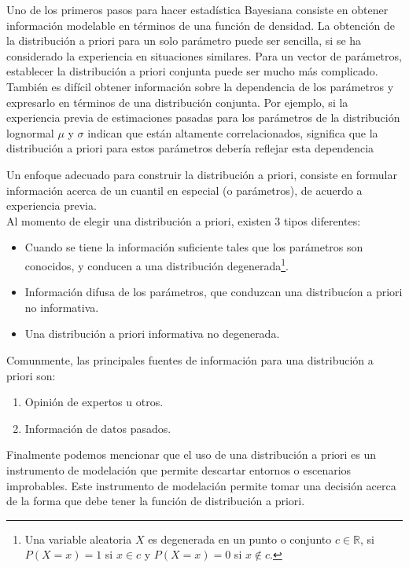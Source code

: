 \noindent Uno de los primeros pasos para hacer estad\'istica Bayesiana consiste en obtener informaci\'on modelable en t\'erminos de una funci\'on de densidad.
La obtenci\'on de la distribuci\'on a priori para un solo par\'ametro puede ser sencilla, si se ha considerado la experiencia en situaciones similares. Para un vector de par\'ametros, establecer la distribuci\'on a priori conjunta puede ser mucho m\'as complicado. Tambi\'en es dif\'icil obtener informaci\'on sobre la dependencia de los par\'ametros y expresarlo en t\'erminos de una distribuci\'on conjunta. Por ejemplo, si la experiencia previa  de estimaciones pasadas para los par\'ametros de la distribuci\'on  lognormal $\mu$ y $\sigma$ indican que est\'an altamente correlacionados, significa que la distribuci\'on a priori para estos par\'ametros deber\'ia reflejar esta dependencia


\noindent Un enfoque adecuado para construir la distribuci\'on a priori, consiste en formular informaci\'on acerca de un cuantil en especial (o par\'ametros), de acuerdo a experiencia previa.\\[0.2cm]

\noindent  Al momento de elegir una distribuci\'on a priori, existen 3 tipos diferentes:
 \begin{itemize}
 \item Cuando se tiene la informaci\'on suficiente tales que los par\'ametros son conocidos, y conducen a una distribuci\'on degenerada\footnote{Una variable aleatoria $X$ es degenerada en un punto o conjunto $c\in \mathbb{R}$, si $P(X=x)=1$ si $x\in c$ y $P(X=x)=0$ si  $x\notin c.$}. 
 \item Informaci\'on difusa de los par\'ametros, que conduzcan una distribuc\'ion a priori no informativa.
 \item Una distribuci\'on a priori informativa no degenerada.
 \end{itemize}
 
 
\noindent Comunmente, las principales fuentes de informaci\'on para una distribuci\'on a priori son:
 
 \begin{enumerate}
 \item Opini\'on de expertos u otros.
 \item Informaci\'on de datos pasados.
 \end{enumerate}
 
\noindent  Finalmente podemos mencionar que el uso de una distribuci\'on a priori es un instrumento de modelaci\'on que permite descartar entornos o escenarios improbables. Este  instrumento de modelaci\'on  permite tomar una decisi\'on acerca de la forma que debe tener la funci\'on de distribuci\'on a priori.

